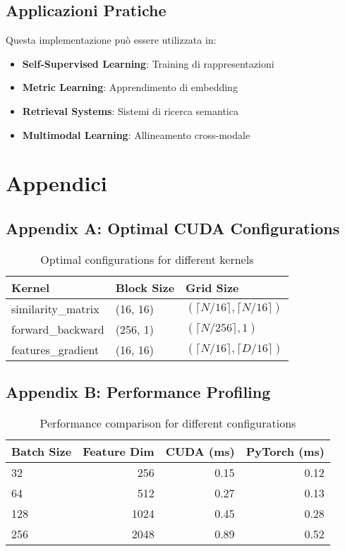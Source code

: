\documentclass[a4paper,11pt]{article}
\begin{document}
\subsection{Applicazioni Pratiche}

Questa implementazione può essere utilizzata in:
\begin{itemize}
    \item \textbf{Self-Supervised Learning}: Training di rappresentazioni
    \item \textbf{Metric Learning}: Apprendimento di embedding
    \item \textbf{Retrieval Systems}: Sistemi di ricerca semantica
    \item \textbf{Multimodal Learning}: Allineamento cross-modale
\end{itemize}

\section{Appendici}

\subsection{Appendix A: Optimal CUDA Configurations}

\begin{table}[H]
\centering
\begin{tabular}{|l|l|l|}
\hline
\textbf{Kernel} & \textbf{Block Size} & \textbf{Grid Size} \\
\hline
similarity\_matrix & (16, 16) & $(\lceil N/16 \rceil, \lceil N/16 \rceil)$ \\
forward\_backward & (256, 1) & $(\lceil N/256 \rceil, 1)$ \\
features\_gradient & (16, 16) & $(\lceil N/16 \rceil, \lceil D/16 \rceil)$ \\
\hline
\end{tabular}
\caption{Optimal configurations for different kernels}
\end{table}

\subsection{Appendix B: Performance Profiling}

\begin{table}[H]
\centering
\begin{tabular}{|l|r|r|r|}
\hline
\textbf{Batch Size} & \textbf{Feature Dim} & \textbf{CUDA (ms)} & \textbf{PyTorch (ms)} \\
\hline
32 & 256 & 0.15 & 0.12 \\
64 & 512 & 0.27 & 0.13 \\
128 & 1024 & 0.45 & 0.28 \\
256 & 2048 & 0.89 & 0.52 \\
\hline
\end{tabular}
\caption{Performance comparison for different configurations}
\end{table}
\end{document}
